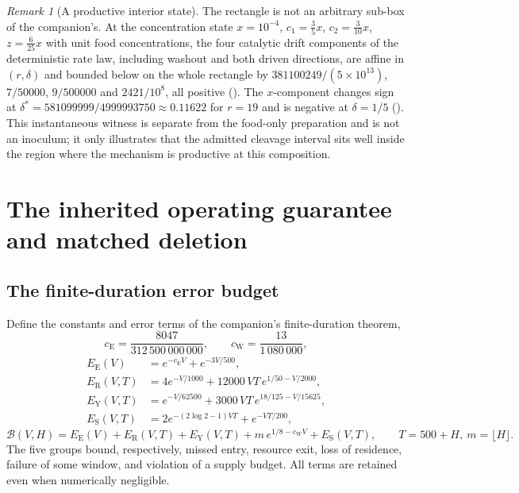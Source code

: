 \documentclass[11pt,a4paper]{article}
\theoremstyle{plain}
\theoremstyle{definition}
\theoremstyle{remark}
\newtheorem{remark}[theorem]{Remark}
\newcommand{\Bud}{\mathcal B}
\newcommand{\cE}{c_{\mathrm E}}
\newcommand{\cW}{c_{\mathrm W}}
\newcommand{\EE}{E_{\mathrm E}}
\newcommand{\ER}{E_{\mathrm R}}
\newcommand{\EY}{E_{\mathrm Y}}
\newcommand{\ES}{E_{\mathrm S}}
\begin{document}
\begin{remark}[A productive interior state]\label{rem:productive}
The rectangle is not an arbitrary sub-box of the companion's. At the concentration state $x=10^{-4}$, $c_1=\tfrac35x$, $c_2=\tfrac3{10}x$, $z=\tfrac6{25}x$ with unit food concentrations, the four catalytic drift components of the deterministic rate law, including washout and both driven directions, are affine in $(r,\delta)$ and bounded below on the whole rectangle by $381100249/(5\times10^{13})$, $7/50000$, $9/500000$ and $2421/10^8$, all positive (). The $x$-component changes sign at $\delta^*=581099999/4999993750\approx0.11622$ for $r=19$ and is negative at $\delta=1/5$ (). This instantaneous witness is separate from the food-only preparation and is not an inoculum; it only illustrates that the admitted cleavage interval sits well inside the region where the mechanism is productive at this composition.
\end{remark}

\section{The inherited operating guarantee and matched deletion}\label{sec:transfer}

\subsection{The finite-duration error budget}\label{sec:budget}
Define the constants and error terms of the companion's finite-duration theorem,
\begin{equation}\label{eq:constants}
 \cE=\frac{8047}{312\,500\,000\,000},\qquad \cW=\frac{13}{1\,080\,000},
\end{equation}
\begin{equation}\label{eq:terms}
\begin{aligned}
 \EE(V)&=e^{-\cE V}+e^{-3V/500},\\
 \ER(V,T)&=4e^{-V/1000}+12000\,VT\,e^{1/50-V/2000},\\
 \EY(V,T)&=e^{-V/62500}+3000\,VT\,e^{18/125-V/15625},\\
 \ES(V,T)&=2e^{-(2\log2-1)VT}+e^{-VT/200},
\end{aligned}
\end{equation}
\begin{equation}\label{eq:budget}
 \Bud(V,H)=\EE(V)+\ER(V,T)+\EY(V,T)+m\,e^{1/8-\cW V}+\ES(V,T),\qquad T=500+H,\ m=\lfloor H\rfloor .
\end{equation}
The five groups bound, respectively, missed entry, resource exit, loss of residence, failure of some window, and violation of a supply budget. All terms are retained even when numerically negligible.
\end{document}
